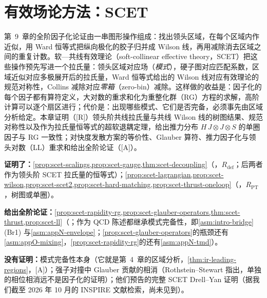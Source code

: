 \chapter{有效场论方法：SCET}\label{ch:scet}

第~9~章的全阶因子化论证由一串图形操作组成：找出领头区域，在每个区域内作近似，用 Ward 恒等式把纵向极化的胶子归并成 Wilson 线，再用减除消去区域之间的重复计数。软—共线有效理论（soft-collinear effective theory，SCET）\cite{BauerFlemingLuke2000,BauerEtAl2001,BauerStewart2001,BauerPirjolStewart2002,BauerEtAl2002}把这些操作预先写进一个拉氏量：领头区域对应场（\emph{模式}），硬子图对应匹配系数，区域近似对应多极展开后的拉氏量，Ward 恒等式给出的 Wilson 线对应有效理论的规范对称性，Collins 减除对应\emph{零箱}（zero-bin）减除。这样做的收益是：因子化的每个因子都有算符定义，大对数的重求和化为重整化群（RG）方程的求解，高阶计算可以逐个扇区进行；代价是：出现哪些模式、它们是否完备，必须事先由区域分析给定。本章证明（[R]）领头阶共线拉氏量与共线 Wilson 线的树图结果、规范对称性以及作为拉氏量恒等式的超软退耦定理，给出推力分布 $H\,J\otimes J\otimes S$ 的单圈因子与 RG 一致性；对快度发散方案的等价性、Glauber 算符、推力因子化与领头对数（LL）重求和给出全阶论证（[A]）。

\begin{tcolorbox}[enhanced,breakable,title=本章证明了什么／没有证明什么,fonttitle=\bfseries,
  colback=gray!3!white,colframe=gray!55!black,boxrule=0.6pt,arc=2pt,
  left=5pt,right=5pt,top=3pt,bottom=3pt,before skip=6pt,after skip=6pt]
\textbf{证明了：}\cref{prop:scet-scalings,prop:scet-gauge,thm:scet-decoupling}（\tagR，$R_{\mathrm{def}}$；后两者作为领头阶 SCET 拉氏量的恒等式）；\cref{prop:scet-lagrangian,prop:scet-wilson,prop:scet-scet2,prop:scet-hard-matching,prop:scet-thrust-oneloop}（\tagR，$R_{\mathrm{PT}}$，树图或单圈）。\par
\textbf{给出全阶论证：}\cref{prop:scet-rapidity-rg,prop:scet-glauber-operators,thm:scet-thrust,prop:scet-ll}（\tagA；作为 QCD 陈述都继承模式完备性，即\cref{asm:intro-bridge}(Br1) 与\cref{asm:appN-envelope}；\cref{prop:scet-glauber-operators}的瓶颈还有\cref{asm:appO-mixing}，\cref{prop:scet-rapidity-rg}的还有\cref{asm:appN-tmd}）。\par
\textbf{没有证明：}模式完备性本身（它就是第~4~章的区域分析，\cref{thm:ir-leading-regions}，[A]）；强子对撞中 Glauber 贡献的相消（Rothstein--Stewart 指出，单独的相位相消远不是因子化的证明）；他们预告的完整 SCET Drell--Yan 证明（据我们截至 2026 年 10 月的 INSPIRE 文献检索，尚未见到）。
\end{tcolorbox}

